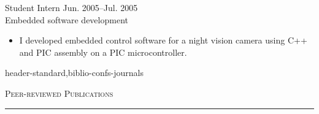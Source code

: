 \documentclass[10pt]{article}
\newcommand{\mysec}[1]{%
  \par\addvspace{2em}%
  \Needspace{8\baselineskip}%
  \noindent\textsc{\large #1}\par\vspace{1mm}\hrule\vspace{2mm}%
}
\newcommand{\myssub}[1]{%
  \par\begingroup
    \leftskip=2mm\relax
    \noindent #1\par
  \endgroup
  \vspace{1mm}%
}
\begin{document}
\myssub{Student Intern \hfill Jun. 2005--Jul. 2005 \\
Embedded software development
\vspace{-1mm}
\begin{itemize}
\setlength\itemsep{0em}
\item{I developed embedded control software for a night vision camera using C++ and PIC assembly on a PIC microcontroller.}
\end{itemize}
}




\begin{btSect}{header-standard,biblio-confs-journals}
\mysec{Peer-reviewed Publications}
\btPrintAll
\end{btSect}
\end{document}
